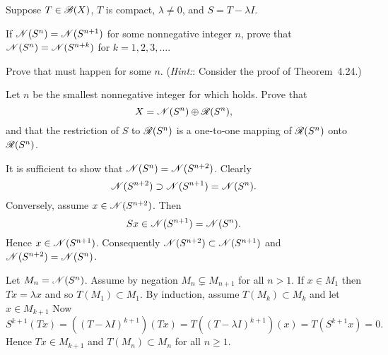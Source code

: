 \begin{enumerate}
\begin{itemize}
\end{itemize}

\unfinished

\begin{excopy}
Suppose \(T \in \mathscr{B}(X)\), $T$ is compact, \(\lambda \neq 0\),
 and \(S = T - \lambda I\).
\begin{itemize}

If \(\mathscr{N}(S^n) = \mathscr{N}(S^{n+1})\) for some  nonnegative integer $n$,
 prove that \(\mathscr{N}(S^n) = \mathscr{N}(S^{n+k})\)
for \(k=1,2,3,\ldots\).

Prove that  must happen for some $n$. 
(\emph{Hint:}: Consider the proof of Theorem~4.24.)

Let $n$ be the smallest nonnegative integer for which  holds.
 Prove that
\begin{equation*}
X = \mathscr{N}(S^n) \oplus \mathscr{R}(S^n),
\end{equation*}
and that the restriction of $S$ to \(\mathscr{R}(S^n)\) is a one-to-one mapping
 of \(\mathscr{R}(S^n)\) onto \(\mathscr{R}(S^n)\).

\end{itemize}

\end{excopy}

\begin{itemize}

It is sufficient to show that \(\mathscr{N}(S^n) = \mathscr{N}(S^{n+2})\).
Clearly 
\begin{equation*}
\mathscr{N}(S^{n+2}) \supset \mathscr{N}(S^{n+1}) = \mathscr{N}(S^n).
\end{equation*}
Conversely, assume \(x\in \mathscr{N}(S^{n+2})\). Then 
\begin{equation*}
Sx \in  \mathscr{N}(S^{n+1}) = \mathscr{N}(S^n).
\end{equation*}
Hence \(x \in \mathscr{N}(S^{n+1})\).
Consequently \(\mathscr{N}(S^{n+2}) \subset \mathscr{N}(S^{n+1})\)
and \(\mathscr{N}(S^{n+2}) = \mathscr{N}(S^n)\).

Let \(M_n = \mathscr{N}(S^n)\).
Assume by negation \(M_n \subsetneq M_{n+1}\) for all \(n>1\).
If \(x\in M_1\) then \(Tx = \lambda x\) and so \(T(M_1) \subset M_1\).
By induction, assume \(T(M_k) \subset M_k\) and let \(x\in M_{k+1}\)
Now
\begin{equation*}
S^{k+1}(Tx)
 = \left((T - \lambda I)^{k+1}\right)(Tx)
 = T\left((T - \lambda I)^{k+1}\right)(x)
 = T(S^{k+1} x) = 0.
\end{equation*}
Hence \(Tx \in M_{k+1}\) and  \(T(M_n) \subset M_n\) for all \(n \geq 1\).


\end{itemize}
\end{enumerate}
